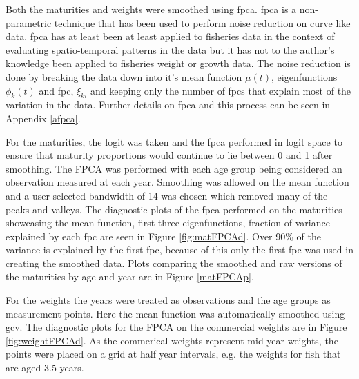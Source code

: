 \documentclass[11pt]{article}\usepackage[]{graphicx}\usepackage[]{color}
\begin{document}
 Both the maturities and weights were smoothed using \acrfull{fpca}. \acrshort{fpca} is a non-parametric technique that has been used to perform noise reduction on curve like data\cite{ramsay2007applied}. \acrshort{fpca} has at least been at least applied to fisheries data in the context of evaluating spatio-temporal patterns in the data\cite{embling_2012} but it has not to the author's knowledge been applied to fisheries weight or growth data. The noise reduction is done by breaking the data down into it's mean function $\mu(t)$, eigenfunctions $\phi_k(t)$ and \acrfull{fpc}, $\xi_{ki}$ and keeping only the number of \acrshort{fpc}s that explain most of the variation in the data.  Further details on \acrshort{fpca} and this process can be seen in Appendix \ref{afpca}.

For the maturities, the logit was taken and the \acrshort{fpca} performed in logit space to ensure that maturity proportions would continue to lie between 0 and 1 after smoothing. The FPCA was performed with each age group being considered an observation measured at each year. Smoothing was allowed on the mean function and a user selected bandwidth of 14 was chosen which removed many of the peaks and valleys. The diagnostic plots of the \acrshort{fpca} performed on the maturities showcasing the mean function, first three eigenfunctions, fraction of variance explained by each \acrshort{fpc} are seen in Figure \ref{fig:matFPCAd}. Over 90\% of the variance is explained by the first \acrshort{fpc}, because of this only the first \acrshort{fpc} was used in creating the smoothed data. Plots comparing the smoothed and raw versions of the maturities by age and year are in Figure \ref{matFPCAp}.

For the weights the years were treated as observations and the age groups as measurement points. Here the mean function was automatically smoothed using \acrfull{gcv}. The diagnostic plots for the FPCA on the commercial weights are in Figure \ref{fig:weightFPCAd}. As the commerical weights represent mid-year weights, the points were placed on a grid at half year intervals, e.g. the weights for fish that are aged 3.5 years. 
\end{document}

